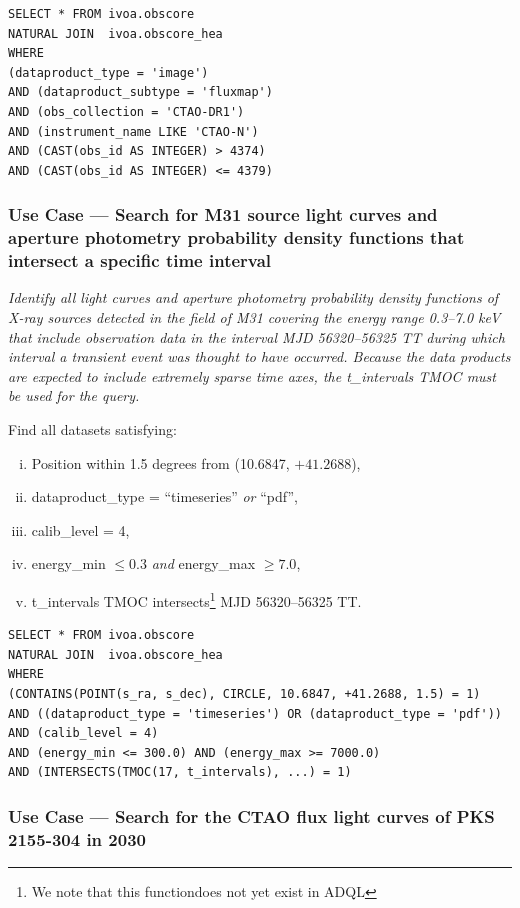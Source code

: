 \begin{verbatim}
SELECT * FROM ivoa.obscore
NATURAL JOIN  ivoa.obscore_hea
WHERE
(dataproduct_type = 'image')
AND (dataproduct_subtype = 'fluxmap')
AND (obs_collection = 'CTAO-DR1')
AND (instrument_name LIKE 'CTAO-N')
AND (CAST(obs_id AS INTEGER) > 4374)
AND (CAST(obs_id AS INTEGER) <= 4379)
\end{verbatim}


\subsubsection{Use Case --- Search for M31 source light curves and aperture photometry probability density functions that intersect a specific time interval}

{\em Identify all light curves and aperture photometry probability density functions of X-ray sources detected in the field of M31 covering the energy range 0.3--7.0 keV that include observation data in the interval MJD 56320--56325 TT during which interval a transient event was thought to have occurred.  Because the data products are expected to include extremely sparse time axes, the t\_intervals TMOC must be used for the query.\/}

\medskip
\noindent Find all datasets satisfying:
\begin{enumerate}[(i)]
  \item Position within 1.5 degrees from (10.6847, $+41.2688$),
  \item dataproduct\_type = ``timeseries'' {\em or\/} ``pdf'',
  \item calib\_level = 4,
  \item energy\_min $\leq 0.3$ {\em and\/} energy\_max $\geq 7.0$,
  \item t\_intervals TMOC intersects\footnote{We note that this functiondoes not yet exist in ADQL} MJD 56320--56325 TT.
\end{enumerate}


\begin{verbatim}
SELECT * FROM ivoa.obscore
NATURAL JOIN  ivoa.obscore_hea
WHERE
(CONTAINS(POINT(s_ra, s_dec), CIRCLE, 10.6847, +41.2688, 1.5) = 1)
AND ((dataproduct_type = 'timeseries') OR (dataproduct_type = 'pdf'))
AND (calib_level = 4)
AND (energy_min <= 300.0) AND (energy_max >= 7000.0)
AND (INTERSECTS(TMOC(17, t_intervals), ...) = 1)
\end{verbatim}

\subsubsection{Use Case --- Search for the CTAO flux light curves of PKS 2155-304 in 2030}

